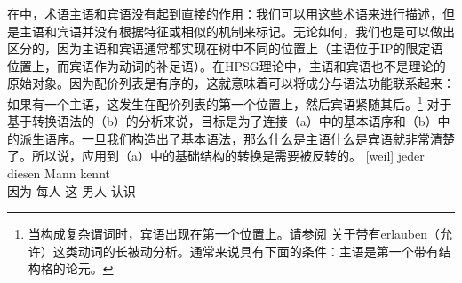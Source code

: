 在\gbtc 中，术语主语和宾语没有起到直接的作用：我们可以用这些术语来进行描述，但是主语和宾语并没有根据特征或相似的机制来标记。无论如何，我们也是可以做出区分的，因为主语和宾语通常都实现在树中不同的位置上（主语位于IP的限定语位置上，而宾语作为动词的补足语）。在HPSG理论中，主语和宾语也不是理论的原始对象。因为配价列表是有序的，这就意味着可以将\argstc 成分与语法功能联系起来：如果有一个主语，这发生在配价列表的第一个位置上，然后宾语紧随其后。\footnote{%
当构成复杂谓词时，宾语出现在第一个位置上。请参阅 关于带有erlauben（允许）这类动词的长被动分析。通常来说具有下面的条件：主语是第一个带有结构格的论元。
} 
对于基于转换语法的（b）的分析来说，目标是为了连接（a）中的基本语序和（b）中的派生语序。一旦我们构造出了基本语法，那么什么是主语什么是宾语就非常清楚了。所以说，应用到（a）中的基础结构的转换是需要被反转的。
\eal
\ex 
\gll {}[weil] jeder diesen Mann kennt\\
	 {}\spacebr{}因为 每人 这 男人 认识\\
